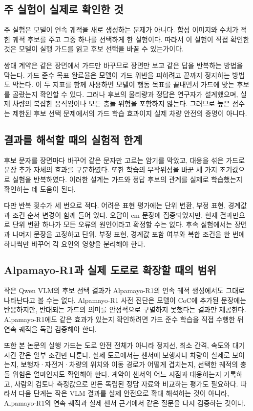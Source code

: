 \subsection{주 실험이 실제로 확인한 것}

주 실험은 모델이 연속 궤적을 새로 생성하는 문제가 아니다. 합성 이미지와 수치가 적힌 궤적 후보를 주고 그중 하나를 선택하게 한 실험이다. 따라서 이 실험이 직접 확인한 것은 모델이 실행 가드를 읽고 후보 선택을 바꿀 수 있는가이다.

쌍대 계약은 같은 장면에서 가드만 바꾸므로 장면만 보고 같은 답을 반복하는 방법을 막는다. 가드 준수 목표 완료율은 모델이 가드 위반을 피하려고 끝까지 정지하는 방법도 막는다. 이 두 지표를 함께 사용하면 모델이 행동 목표를 끝내면서 가드에 맞는 후보를 골랐는지 확인할 수 있다. 그러나 후보의 물리량과 정답은 연구자가 설계했으며, 실제 차량의 복잡한 움직임이나 모든 충돌 위험을 포함하지 않는다. 그러므로 높은 점수는 제한된 후보 선택 문제에서의 가드 학습 효과이지 실제 차량 안전의 증명이 아니다.

\subsection{결과를 해석할 때의 실험적 한계}

후보 문자를 장면마다 바꾸어 같은 문자만 고르는 암기를 막았고, 대응을 섞은 가드로 문장 추가 자체의 효과를 구분하였다. 또한 학습의 무작위성을 바꾼 세 가지 초기값으로 실험을 반복하였다. 이러한 설계는 가드와 정답 후보의 관계를 실제로 학습했는지 확인하는 데 도움이 된다.

다만 반복 횟수가 세 번으로 적다. 어려운 표현 평가에는 단위 변환, 부정 표현, 경계값과 조건 순서 변경이 함께 들어 있다. 오답이 cm 문장에 집중되었지만, 현재 결과만으로 단위 변환 하나가 모든 오류의 원인이라고 확정할 수는 없다. 후속 실험에서는 장면과 나머지 문장을 고정하고 단위, 부정 표현, 경계값 포함 여부와 복합 조건을 한 번에 하나씩만 바꾸어 각 요인의 영향을 분리해야 한다.

\subsection{Alpamayo-R1과 실제 도로로 확장할 때의 범위}

작은 Qwen VLM의 후보 선택 결과가 Alpamayo-R1의 연속 궤적 생성에서도 그대로 나타난다고 볼 수는 없다. Alpamayo-R1 사전 진단은 모델이 CoC에 추가된 문장에는 반응하지만, 반대되는 가드의 의미를 안정적으로 구별하지 못했다는 결과만 제공한다. Alpamayo-R1에도 같은 효과가 있는지 확인하려면 가드 준수 학습을 직접 수행한 뒤 연속 궤적을 독립 검증해야 한다.

또한 본 논문의 실행 가드는 도로 안전 전체가 아니라 정지선, 최소 간격, 속도와 대기시간 같은 일부 조건만 다룬다. 실제 도로에서는 센서에 보행자나 차량이 실제로 보이는지, 보행자·자전거·차량의 위치와 이동 경로가 어떻게 겹치는지, 선택한 궤적의 충돌 위험은 얼마인지도 확인해야 한다. 계약이 센서의 어느 시점과 대응하는지 기록하고, 사람의 검토나 측정값으로 만든 독립된 정답 자료와 비교하는 평가도 필요하다. 따라서 다음 단계는 작은 VLM 결과를 실제 안전으로 확대 해석하는 것이 아니라, Alpamayo-R1의 연속 궤적과 실제 센서 근거에서 같은 질문을 다시 검증하는 것이다.

